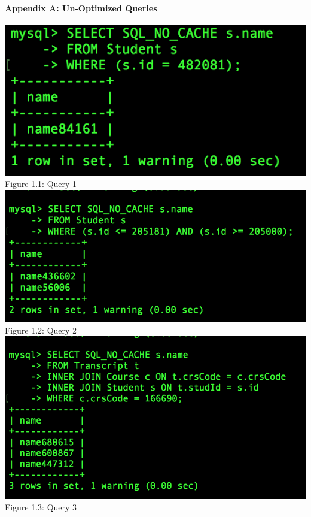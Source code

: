 \documentclass[11pt]{report}
\begin{document}
	\paragraph*{Appendix A: Un-Optimized Queries}
		\begin{center}
			\includegraphics[scale=0.89]{b1.PNG}\\
			Figure 1.1: Query 1\\
			\includegraphics[scale=0.625]{b2.PNG}\\
			Figure 1.2: Query 2\\
			\includegraphics[scale=0.61]{b3.PNG}\\
			Figure 1.3: Query 3\\

\end{center}
\end{document}
